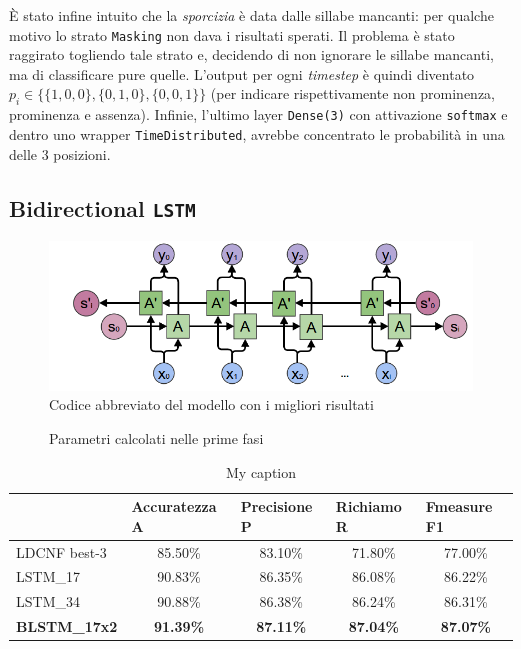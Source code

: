 \documentclass[twoside,twocolumn,10pt]{extarticle}
\theoremstyle{definition}
\begin{document}
		È stato infine intuito che la \textit{sporcizia} è data dalle sillabe mancanti: per qualche motivo lo strato \texttt{Masking} non dava i risultati sperati. Il problema è stato raggirato togliendo tale strato e, decidendo di non ignorare le sillabe mancanti, ma di classificare pure quelle. L'output per ogni \textit{timestep} è quindi diventato $p_i \in \{\{1, 0, 0\}, \{0, 1, 0\}, \{0, 0, 1\}\}$ (per indicare rispettivamente non prominenza, prominenza e assenza). Infinie, l'ultimo layer \texttt{Dense(3)} con attivazione \texttt{softmax} e dentro uno wrapper \texttt{TimeDistributed}, avrebbe concentrato le probabilità in una delle $3$ posizioni.
		
	\subsection{Bidirectional \texttt{LSTM}}
		\begin{figure}
			\centering
			\label{fig:blstm}
			\includegraphics[scale=.26]{img/blstm.png}
			\caption{Codice abbreviato del modello con i migliori risultati}
		\end{figure}
		\begin{figure}[ht!]
			\centering
			\caption{Parametri calcolati nelle prime fasi}
			
			\label{fig:modelcode}
		\end{figure}
		\begin{table}[]
			\centering
			\caption{My caption}
			\label{tab:results}
			\begin{tabular}{lcccc}
				\hline
				& \multicolumn{1}{l}{Accuratezza A} & \multicolumn{1}{l}{Precisione P} & \multicolumn{1}{l}{Richiamo R} & \multicolumn{1}{l}{Fmeasure F1} \\ \hline
				LDCNF best-3 & 85.50\% & 83.10\% & 71.80\% & 77.00\% \\
				LSTM\_17 & 90.83\% & 86.35\% & 86.08\% & 86.22\% \\
				LSTM\_34 & 90.88\% & 86.38\% & 86.24\% & 86.31\% \\
				\textbf{BLSTM\_17x2} & \textbf{91.39\%} & \textbf{87.11\%} & \textbf{87.04\%} & \textbf{87.07\%} \\ \hline
			\end{tabular}
		\end{table}
\end{document}
